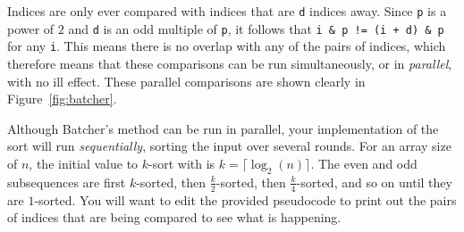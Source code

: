 Indices are only ever compared with indices that are \texttt{d} indices away.
Since \texttt{p} is a power of $2$ and \texttt{d} is an odd multiple of
\texttt{p}, it follows that \texttt{i \& p != (i + d) \& p} for any \texttt{i}.
This means there is no overlap with any of the pairs of indices, which therefore
means that these comparisons can be run simultaneously, or in \emph{parallel},
with no ill effect. These parallel comparisons are shown clearly in
Figure~\ref{fig:batcher}.

Although Batcher's method can be run in parallel, your implementation of the
sort will run \emph{sequentially}, sorting the input over several rounds. For an
array size of $n$, the initial value to $k$-sort with is $k = \lceil \log_2(n)
\rceil$. The even and odd subsequences are first $k$-sorted, then
$\frac{k}{2}$-sorted, then $\frac{k}{4}$-sorted, and so on until they are
$1$-sorted. You will want to edit the provided pseudocode to print out the pairs
of indices that are being compared to see what is happening.

